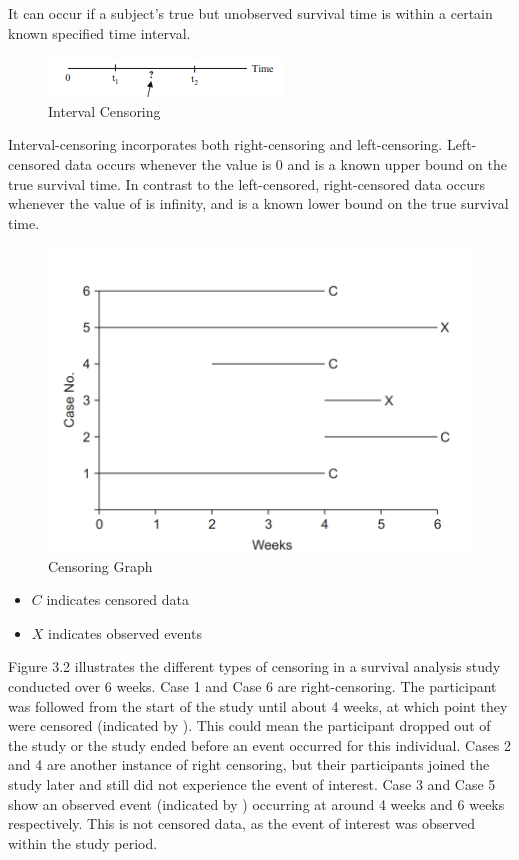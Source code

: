 \documentclass[12pt]{report}
\begin{document}
It can occur if a subject’s true but unobserved survival time is within a certain known specified time interval. 
\begin{figure}
    \centering
    \includegraphics[width=0.5\linewidth]{Figure 3/3.1.png}
    \caption{Interval Censoring}
    \label{Figure 3.1}
\end{figure}

Interval-censoring incorporates both right-censoring and left-censoring. Left-censored data occurs whenever the value is 0 and  is a known upper bound on the true survival time. In contrast to the left-censored, right-censored data occurs whenever the value of  is infinity, and is a known lower bound on the true survival time.

\begin{figure}
    \centering
    \includegraphics[width=01\linewidth]{Figure 3/3.2.png}
    \caption{Censoring Graph}
    \label{Figure 3.1}
\end{figure}


\begin{itemize}

\item \(C\) indicates censored data
\item  \(X\) indicates observed events


\end{itemize}

Figure 3.2 illustrates the different types of censoring in a survival analysis study conducted over 6 weeks. Case 1 and Case 6 are right-censoring. The participant was followed from the start of the study until about 4 weeks, at which point they were censored (indicated by ). This could mean the participant dropped out of the study or the study ended before an event occurred for this individual. Cases 2 and 4 are another instance of right censoring, but their participants joined the study later and still did not experience the event of interest. Case 3 and Case 5 show an observed event (indicated by ) occurring at around 4 weeks and 6 weeks respectively. This is not censored data, as the event of interest was observed within the study period.
\end{document}

